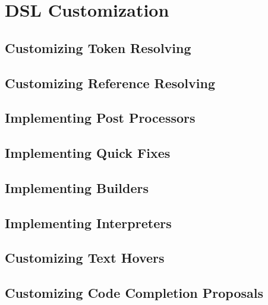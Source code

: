 \chapter{DSL Customization}

\section{Customizing Token Resolving}
\label{sec:cust_token_resolving}

\section{Customizing Reference Resolving}
\label{sec:cust_reference_resolving}

\section{Implementing Post Processors}

\section{Implementing Quick Fixes}

\section{Implementing Builders}

\section{Implementing Interpreters}

\section{Customizing Text Hovers}

\section{Customizing Code Completion Proposals}

